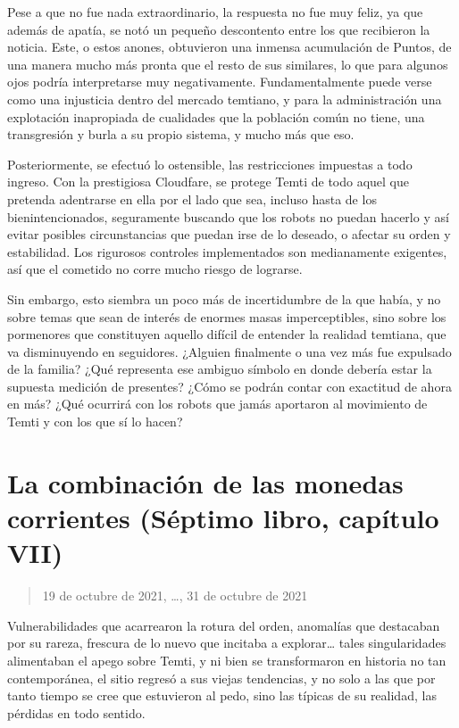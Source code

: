 \documentclass[
]{book}
\begin{document}
Pese a que no fue nada extraordinario, la respuesta no fue muy feliz, ya que además de apatía, se notó un pequeño descontento entre los que recibieron la noticia. Este, o estos anones, obtuvieron una inmensa acumulación de Puntos, de una manera mucho más pronta que el resto de sus similares, lo que para algunos ojos podría interpretarse muy negativamente. Fundamentalmente puede verse como una injusticia dentro del mercado temtiano, y para la administración una explotación inapropiada de cualidades que la población común no tiene, una transgresión y burla a su propio sistema, y mucho más que eso.

Posteriormente, se efectuó lo ostensible, las restricciones impuestas a todo ingreso. Con la prestigiosa Cloudfare, se protege Temti de todo aquel que pretenda adentrarse en ella por el lado que sea, incluso hasta de los bienintencionados, seguramente buscando que los robots no puedan hacerlo y así evitar posibles circunstancias que puedan irse de lo deseado, o afectar su orden y estabilidad. Los rigurosos controles implementados son medianamente exigentes, así que el cometido no corre mucho riesgo de lograrse.

Sin embargo, esto siembra un poco más de incertidumbre de la que había, y no sobre temas que sean de interés de enormes masas imperceptibles, sino sobre los pormenores que constituyen aquello difícil de entender la realidad temtiana, que va disminuyendo en seguidores. ¿Alguien finalmente o una vez más fue expulsado de la familia? ¿Qué representa ese ambiguo símbolo en donde debería estar la supuesta medición de presentes? ¿Cómo se podrán contar con exactitud de ahora en más? ¿Qué ocurrirá con los robots que jamás aportaron al movimiento de Temti y con los que sí lo hacen?

\hypertarget{la-combinaciuxf3n-de-las-monedas-corrientes-suxe9ptimo-libro-capuxedtulo-vii}{%
\section{La combinación de las monedas corrientes (Séptimo libro, capítulo VII)}\label{la-combinaciuxf3n-de-las-monedas-corrientes-suxe9ptimo-libro-capuxedtulo-vii}}

\begin{quote}
19 de octubre de 2021, \ldots, 31 de octubre de 2021
\end{quote}

Vulnerabilidades que acarrearon la rotura del orden, anomalías que destacaban por su rareza, frescura de lo nuevo que incitaba a explorar\ldots{} tales singularidades alimentaban el apego sobre Temti, y ni bien se transformaron en historia no tan contemporánea, el sitio regresó a sus viejas tendencias, y no solo a las que por tanto tiempo se cree que estuvieron al pedo, sino las típicas de su realidad, las pérdidas en todo sentido.
\end{document}
